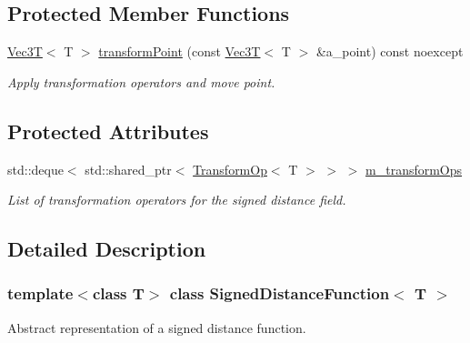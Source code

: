 \subsection*{Protected Member Functions}
\begin{DoxyCompactItemize}
\item 
\mbox{\label{classSignedDistanceFunction_af186f98f9ea4ac96fccb4add4ebf196d}} 
\hyperlink{classVec3T}{Vec3T}$<$ T $>$ \hyperlink{classSignedDistanceFunction_af186f98f9ea4ac96fccb4add4ebf196d}{transform\+Point} (const \hyperlink{classVec3T}{Vec3T}$<$ T $>$ \&a\+\_\+point) const noexcept
\begin{DoxyCompactList}\small\item\em Apply transformation operators and move point. \end{DoxyCompactList}\end{DoxyCompactItemize}
\subsection*{Protected Attributes}
\begin{DoxyCompactItemize}
\item 
\mbox{\label{classSignedDistanceFunction_af61e5e2ece6add9d2bcf8e5aa8cf2844}} 
std\+::deque$<$ std\+::shared\+\_\+ptr$<$ \hyperlink{classTransformOp}{Transform\+Op}$<$ T $>$ $>$ $>$ \hyperlink{classSignedDistanceFunction_af61e5e2ece6add9d2bcf8e5aa8cf2844}{m\+\_\+transform\+Ops}
\begin{DoxyCompactList}\small\item\em List of transformation operators for the signed distance field. \end{DoxyCompactList}\end{DoxyCompactItemize}


\subsection{Detailed Description}
\subsubsection*{template$<$class T$>$\newline
class Signed\+Distance\+Function$<$ T $>$}

Abstract representation of a signed distance function. 

